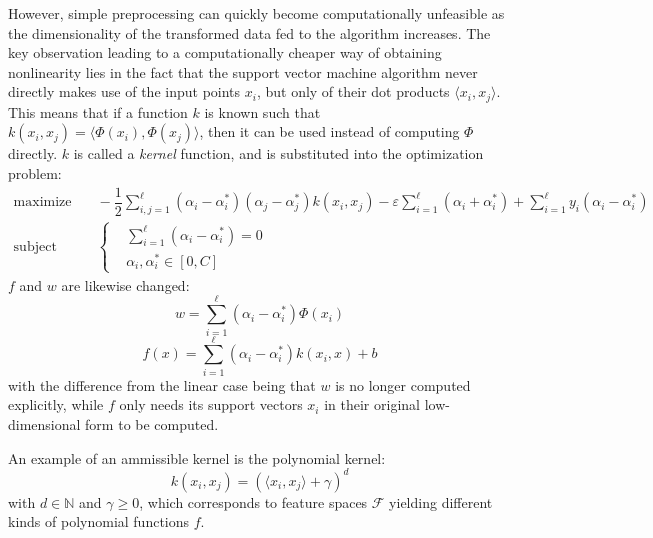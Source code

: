 \documentclass[12pt]{report}
\begin{document}
However, simple preprocessing can quickly become computationally unfeasible as the dimensionality of the transformed data fed to the algorithm increases. The key observation leading to a computationally cheaper way of obtaining nonlinearity lies in the fact that the support vector machine algorithm never directly makes use of the input points $ x_{i} $, but only of their dot products $ \langle x_{i},x_{j} \rangle $. This means that if a function $ k $ is known such that $ k(x_{i},x_{j}) = \langle\Phi (x_{i}),\Phi (x_{j})\rangle $, then it can be used instead of computing $ \Phi $ directly. $ k $ is called a \textit{kernel} function, and is substituted into the optimization problem:
\begin{equation} \label{kernelsmargdual}
\begin{split}
\text{maximize} &\quad
-\dfrac{1}{2}\sum_{i,j=1}^{\ell}(\alpha_{i} - \alpha_{i}^{*})(\alpha_{j} - \alpha_{j}^{*})k(x_{i},x_{j}) -\varepsilon\sum_{i=1}^{\ell}(\alpha_{i} + \alpha_{i}^{*}) + \sum_{i=1}^{\ell}y_{i}(\alpha_{i}-\alpha_{i}^{*}) \\
\text{subject to} &\quad \left\{\begin{split}
&\sum_{i=1}^{\ell}(\alpha_{i} - \alpha_{i}^{*}) = 0 \\
&\alpha_{i},\alpha_{i}^{*} \in [0,C]
\end{split}\right.
\end{split}
\end{equation}
$ f $ and $ w $ are likewise changed:
\begin{equation} \label{wnonlinear}
w = \sum_{i=1}^{\ell}(\alpha_{i}-\alpha_{i}^{*})\Phi(x_{i})
\end{equation}
\begin{equation} \label{kernelfsvexp}
f(x) = \sum_{i=1}^{\ell}(\alpha_{i}-\alpha_{i}^{*})k(x_{i},x) + b
\end{equation}
with the difference from the linear case being that $ w $ is no longer computed explicitly, while $ f $ only needs its support vectors $ x_{i} $ in their original low-dimensional form to be computed.

An example of an ammissible kernel is the polynomial kernel:
\begin{equation} \label{polykernel}
k(x_{i},x_{j}) = (\langle x_{i},x_{j} \rangle + \gamma)^{d}
\end{equation}
with $ d \in \mathbb{N} $ and $ \gamma \geq 0 $, which corresponds to feature spaces $ \mathcal{F} $ yielding different kinds of polynomial functions $ f $.
\end{document}

